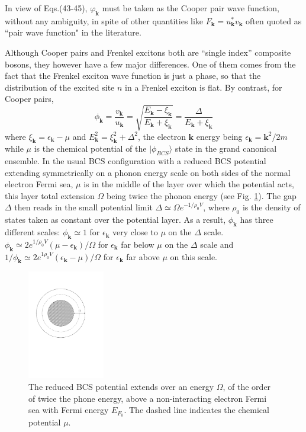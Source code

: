 \documentclass[twocolumn,showpacs]{revtex4}
\def\v#1{\mathbf{#1}}
\begin{document}
In view of Eqs.(43-45), $\varphi_{\v k}$ must be taken as the Cooper pair wave function, without any ambiguity, in spite of other quantities like $F_{\v k}=u_{\v k}^\ast v_{\v k}$ often quoted as ``pair wave function" in the literature. 

Although Cooper pairs and Frenkel excitons both are ``single index'' composite bosons, they however have a few major differences. One of them comes from the fact that the Frenkel exciton wave function is just a phase, so that the distribution of the  excited site $n$  in a Frenkel exciton is flat. By contrast, for Cooper pairs,
\begin{equation}\label{phi}
\phi_{\v k}=\frac{v_{\v k}}{u_{\v k}}=\sqrt{\frac{E_{\v k}-\xi_{\v k}}{E_{\v k}+\xi_{\v k}}}=\frac{\Delta}{E_{\v k}+\xi_{\v k}}
\end{equation}
where $\xi_{\v k}=\epsilon_{\v k}-\mu$ and $E_{\v k}^2=\xi_{\v k}^2+\Delta^2$, the electron $\v k$ energy being $\epsilon_{\v k}=\v k^2/2m$ while $\mu$ is the chemical potential of the $|\phi_{BCS}\rangle$ state in the grand canonical ensemble. In the usual BCS configuration with a reduced BCS potential extending symmetrically on a phonon energy scale on both sides of the normal electron Fermi sea, $\mu$ is in the middle of the layer over which the potential acts, this layer total extension $\Omega$ being twice the phonon energy (see Fig. \ref{potfig}). The gap $\Delta$ then reads in the small potential limit $\Delta\simeq \Omega e^{-1/\rho_0V}$, where $\rho_0$ is the density of states taken as constant over the potential layer. As a result, $\phi_{\v k}$ has three different scales: $\phi_{\v k}\simeq 1$ for $\epsilon_{\v k}$ very close to $\mu$ on the $\Delta$ scale. $\phi_{\v k}\simeq 2e^{1/\rho_0V}(\mu-\epsilon_{\v k})/\Omega$ for $\epsilon_{\v k}$ far below $\mu$ on the $\Delta$ scale and $1/\phi_{\v k}\simeq 2e^{1\rho_0V}(\epsilon_{\v k}-\mu)/\Omega$ for $\epsilon_{\v k}$ far above $\mu$ on this scale.
\begin{figure}[htbp]
\begin{center}
\includegraphics[width=0.3\textwidth]{potential}
\caption{The reduced BCS potential extends over an energy $\Omega$, of the order of twice the phone energy, above a non-interacting electron Fermi sea with Fermi energy $E_{F_0}$.  The dashed line indicates the chemical potential $\mu$.  \label{potfig}} 

\end{center}
\end{figure}
\end{document}
